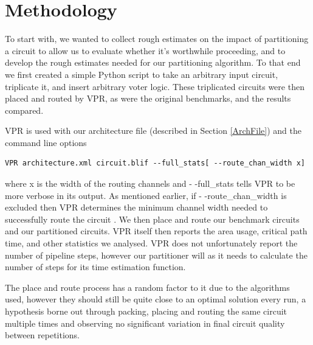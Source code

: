 \documentclass[12pt,drafta4paper,oneside]{memoir} %
\begin{document}

\section{Methodology}\label{BenchmarkMethod}
To start with, we wanted to collect rough estimates on the impact of partitioning a circuit to allow us to evaluate whether it's worthwhile proceeding, and to develop the rough estimates needed for our partitioning algorithm. To that end we first created a simple Python script to take an arbitrary input circuit, triplicate it, and insert arbitrary voter logic. These triplicated circuits were then placed and routed by \ac{VPR}, as were the original benchmarks, and the results compared.

\ac{VPR} is used with our architecture file (described in Section \ref{ArchFile}) and the command line options
\begin{lstlisting}
VPR architecture.xml circuit.blif --full_stats[ --route_chan_width x]
\end{lstlisting} where x is the width of the routing channels and - -full\_stats tells \ac{VPR} to be more verbose in its output.
As mentioned earlier, if - -route\_chan\_width is excluded then \ac{VPR} determines the minimum channel width needed to successfully route the circuit \cite{VPRManual}. We then place and route our benchmark circuits and our partitioned circuits. \ac{VPR} itself then reports the area usage, critical path time, and other statistics we analysed. \ac{VPR} does not unfortunately report the number of pipeline steps, however our partitioner will as it needs to calculate the number of steps for its time estimation function.

The place and route process has a random factor to it due to the algorithms used, however they should still be quite close to an optimal solution every run, a hypothesis borne out through packing, placing and routing the same circuit multiple times and observing no significant variation in final circuit quality between repetitions.
\end{document}
